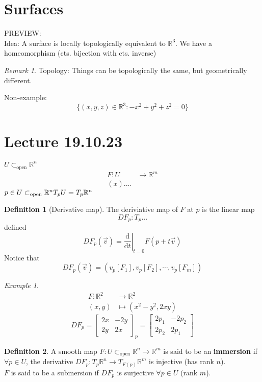 \documentclass{article}
\let\ddd\cdots
\renewcommand{\d}{\mathrm{d}}
\newcommand{\R}{\mathbb{R}}
\newcommand{\dv}[2]{\frac{\d #1}{\d #2}}
\newcommand{\fdv}[3]{\left.\dv{#1}{#2}\right|_{#3}}
\theoremstyle{definition}
\newtheorem{definition}{Definition}[section]
\theoremstyle{remark}
\theoremstyle{example}
\newtheorem*{remark}{Remark}
\newtheorem*{example}{Example}
\begin{document}
	\section{Surfaces}
	PREVIEW:\\
	Idea: A surface is locally topologically equivalent to $\R^3$. We have a homeomorphism (cts. bijection with cts. inverse)
	
	\begin{remark}
		Topology: Things can be topologically the same, but geometrically different.
	\end{remark}

	Non-example: \[\{(x,y,z)\in\R^3 :-x^2+y^2+z^2=0 \}\]
	
	\section*{Lecture 19.10.23}
	$U \subset_\mathrm{open} \R^n$\\
	\begin{align*}
		F:U&\to \R^m\\
		(x)....
	\end{align*}
	$p \in U \subset_\mathrm{open}\R^n\\
	T_pU=T_p\R^n$\\
	\begin{definition}[Derivative map]
		The deriviative map of $F$ at $p$ is the linear map \[DF_p:T_p... \] defined \[ DF_p(\vec{v}) = \fdv{}{t}{t=0}F(p+t\vec{v}) \]
		Notice that \[ DF_p(\vec{v})=(v_p[F_1], v_p[F_2],\ddd,v_p[F_m])\]
	\end{definition}
	\begin{example}
		\begin{align*}
			F:\R^2 &\to \R^2\\
			(x,y) & \mapsto (x^2-y^2,2xy)
		\end{align*}
		\[DF_p= \begin{bmatrix}
			2x&-2y\\
			2y & 2x
		\end{bmatrix}_p = \begin{bmatrix}
		2p_1&-2p_2\\
		2p_2 & 2p_1
		\end{bmatrix} \]
	\end{example}
	\begin{definition}
		A smooth map $F:U\subset_\mathrm{open}\R^n \to \R^m$ is said to be an \textbf{immersion} if $\forall p \in U$, the derivative $DF_p:T_p\R^n \to T_{F(p)}\R^m$ is injective (has rank $n$).\\
		$F$ is said to be a submersion if $DF_p$ is surjective $\forall p \in U$ (rank $m$).
	\end{definition}
\end{document}
